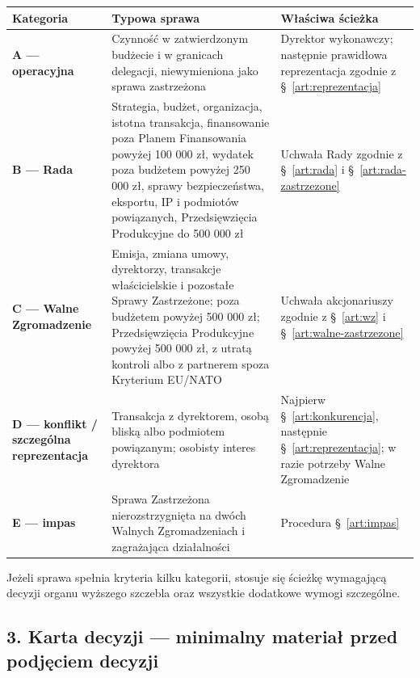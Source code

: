 \documentclass[12pt,a4paper]{report}
\begin{document}
\begin{center}
\small
\begin{tabularx}{\textwidth}{>{\bfseries}p{3.0cm} X X}
\toprule
Kategoria & Typowa sprawa & Właściwa ścieżka \\
\midrule
A — operacyjna & Czynność w zatwierdzonym budżecie i w granicach delegacji, niewymieniona jako sprawa zastrzeżona & Dyrektor wykonawczy; następnie prawidłowa reprezentacja zgodnie z §~\ref{art:reprezentacja} \\
B — Rada & Strategia, budżet, organizacja, istotna transakcja, finansowanie poza Planem Finansowania powyżej 100 000 zł, wydatek poza budżetem powyżej 250 000 zł, sprawy bezpieczeństwa, eksportu, IP i podmiotów powiązanych, Przedsięwzięcia Produkcyjne do 500 000 zł & Uchwała Rady zgodnie z §~\ref{art:rada} i §~\ref{art:rada-zastrzezone} \\
C — Walne Zgromadzenie & Emisja, zmiana umowy, dyrektorzy, transakcje właścicielskie i pozostałe Sprawy Zastrzeżone; poza budżetem powyżej 500 000 zł; Przedsięwzięcia Produkcyjne powyżej 500 000 zł, z utratą kontroli albo z partnerem spoza Kryterium EU/NATO & Uchwała akcjonariuszy zgodnie z §~\ref{art:wz} i §~\ref{art:walne-zastrzezone} \\
D — konflikt / szczególna reprezentacja & Transakcja z dyrektorem, osobą bliską albo podmiotem powiązanym; osobisty interes dyrektora & Najpierw §~\ref{art:konkurencja}, następnie §~\ref{art:reprezentacja}; w razie potrzeby Walne Zgromadzenie \\
E — impas & Sprawa Zastrzeżona nierozstrzygnięta na dwóch Walnych Zgromadzeniach i zagrażająca działalności & Procedura §~\ref{art:impas} \\
\bottomrule
\end{tabularx}
\end{center}

Jeżeli sprawa spełnia kryteria kilku kategorii, stosuje się ścieżkę wymagającą decyzji organu wyższego szczebla oraz wszystkie dodatkowe wymogi szczególne.

\subsection*{3. Karta decyzji — minimalny materiał przed podjęciem decyzji}
\end{document}
